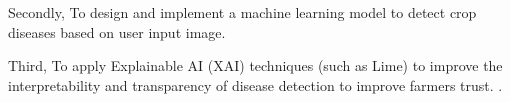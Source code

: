 Secondly,
To design and implement a machine learning model to detect crop diseases based on user input image.

Third,
To apply Explainable AI (XAI) techniques (such as Lime) to improve the interpretability and transparency of disease detection to improve farmers trust.
.

